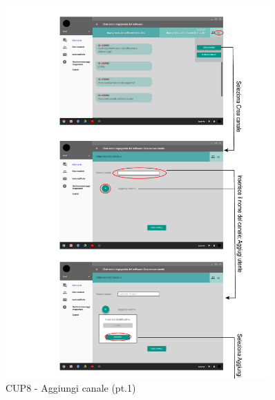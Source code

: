 \begin{figure}
	\centering
	\includegraphics[width=0.9\textwidth]{imgs/gruppo6/activities/act_cup8_aggiungi_canale1.pdf}
	\caption{CUP8 - Aggiungi canale (pt.1)}
	\label{fig:cup8}
\end{figure}

